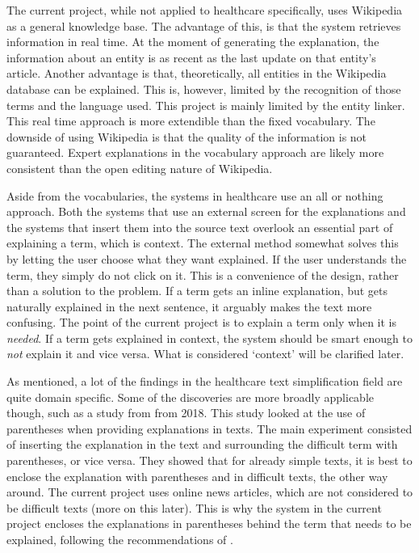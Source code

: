 \documentclass[
10pt, %
a4paper, %
oneside, %
headinclude,footinclude, %
] {book}%
\begin{document}
The current project, while not applied to healthcare specifically, uses Wikipedia as a general knowledge base.
The advantage of this, is that the system retrieves information in real time.
At the moment of generating the explanation, the information about an entity is as recent as the last update on that entity's article.
Another advantage is that, theoretically, all entities in the Wikipedia database can be explained.
This is, however, limited by the recognition of those terms and the language used.
This project is mainly limited by the entity linker.
This real time approach is more extendible than the fixed vocabulary.
The downside of using Wikipedia is that the quality of the information is not guaranteed.
Expert explanations in the vocabulary approach are likely more consistent than the open editing nature of Wikipedia.

Aside from the vocabularies, the systems in healthcare use an all or nothing approach.
Both the systems that use an external screen for the explanations and the systems that insert them into the source text overlook an essential part of explaining a term, which is context.
The external method somewhat solves this by letting the user choose what they want explained.
If the user understands the term, they simply do not click on it.
This is a convenience of the design, rather than a solution to the problem.
If a term gets an inline explanation, but gets naturally explained in the next sentence, it arguably makes the text more confusing.
The point of the current project is to explain a term only when it is \textit{needed}.
If a term gets explained in context, the system should be smart enough to \textit{not} explain it and vice versa.
What is considered `context' will be clarified later.

As mentioned, a lot of the findings in the healthcare text simplification field are quite domain specific.
Some of the discoveries are more broadly applicable though, such as a study from \citeauthor{gu2018} from 2018.
This study looked at the use of parentheses when providing explanations in texts.
The main experiment consisted of inserting the explanation in the text and surrounding the difficult term with parentheses, or vice versa.
They showed that for already simple texts, it is best to enclose the explanation with parentheses and in difficult texts, the other way around.
The current project uses online news articles, which are not considered to be difficult texts (more on this later).
This is why the system in the current project encloses the explanations in parentheses behind the term that needs to be explained, following the recommendations of \citeauthor{gu2018}.
\end{document}
